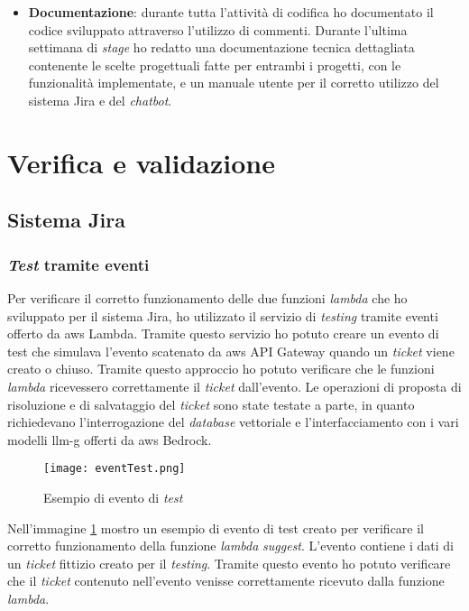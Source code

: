 \begin{itemize}
    \item \textbf{Documentazione}: durante tutta l'attività di codifica ho documentato il codice sviluppato attraverso l'utilizzo di commenti. Durante l'ultima settimana di \textit{stage} ho redatto una documentazione tecnica dettagliata contenente le scelte progettuali fatte per entrambi i progetti, con le funzionalità implementate, e un manuale utente per il corretto utilizzo del sistema Jira e del \textit{chatbot}. 
\end{itemize}

\section{Verifica e validazione}
\subsection{Sistema Jira}
\subsubsection{\textit{Test} tramite eventi}
Per verificare il corretto funzionamento delle due funzioni \textit{lambda} che ho sviluppato per il sistema Jira, ho utilizzato il servizio di \textit{testing} tramite eventi offerto da \gls{aws} Lambda. Tramite questo servizio ho potuto creare un evento di test che simulava l'evento scatenato da \gls{aws} API Gateway quando un \textit{ticket} viene creato o chiuso. Tramite questo approccio ho potuto verificare che le funzioni \textit{lambda} ricevessero correttamente il \textit{ticket} dall'evento. Le operazioni di proposta di risoluzione e di salvataggio del \textit{ticket} sono state testate a parte, in quanto richiedevano l'interrogazione del \textit{database} vettoriale e l'interfacciamento con i vari modelli \gls{llm-g} offerti da \gls{aws} Bedrock. 
\begin{figure}[H]
    \centering
    \texttt{[image: eventTest.png]}
    \caption{Esempio di evento di \textit{test}}
    \label{fig:testLambda}
\end{figure}
\noindent
Nell'immagine \ref{fig:testLambda} mostro un esempio di evento di test creato per verificare il corretto funzionamento della funzione \textit{lambda} \textit{suggest}. L'evento contiene i dati di un \textit{ticket} fittizio creato per il \textit{testing}. Tramite questo evento ho potuto verificare che il \textit{ticket} contenuto nell'evento venisse correttamente ricevuto dalla funzione \textit{lambda}.

